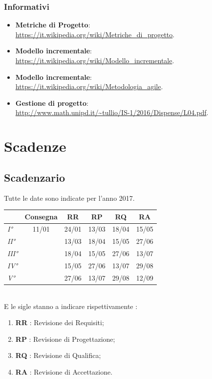 \documentclass[12pt,a4paper,titlepage]{article}
\begin{document}
	\subsubsection{Informativi}
	\begin{itemize}
		\item \textbf{Metriche di Progetto}: \\
		\textcolor{blue}{\url{https://it.wikipedia.org/wiki/Metriche_di_progetto}}.
		\item \textbf{Modello incrementale}: \\
		\textcolor{blue}{\url{https://it.wikipedia.org/wiki/Modello_incrementale}}.
		\item \textbf{Modello incrementale}: \\
		\textcolor{blue}{\url{https://it.wikipedia.org/wiki/Metodologia_agile}}.
		\item \textbf{Gestione di progetto}: \\
		\textcolor{blue}{\url{http://www.math.unipd.it/~tullio/IS-1/2016/Dispense/L04.pdf}}.
	\end{itemize}
	
	\newpage
	
	\section{Scadenze}
	\subsection{Scadenzario}
	Tutte le date sono indicate per l'anno 2017.\\
	
	{\renewcommand\arraystretch{1.2}  %
		\begin{tabular}{|l|c|c|c|c|c|}
			\hline
			& Consegna & \textbf{RR} & \textbf{RP} & \textbf{RQ} & \textbf{RA} \\
			\hline
			\textit{I°} & 11/01 & 24/01 & 13/03 & 18/04 & 15/05 \\
			\textit{II°} &  & 13/03 & 18/04 & 15/05 & 27/06 \\
			\textit{III°} & & 18/04 & 15/05 & 27/06 & 13/07 \\
			\textit{IV°} & & 15/05 & 27/06 & 13/07 & 29/08 \\
			\textit{V°} & & 27/06 & 13/07 & 29/08 & 12/09 \\
			\hline
	\end{tabular}}
	\vspace{0.5cm}
	\\
	E le sigle stanno a indicare rispettivamente :
	\begin{enumerate}
		\item \textbf{RR} : Revisione dei Requisiti;
		\item \textbf{RP} : Revisione di Progettazione;
		\item \textbf{RQ} : Revisione di Qualifica;
		\item \textbf{RA} : Revisione di Accettazione. 
	\end{enumerate}
	
\end{document}
